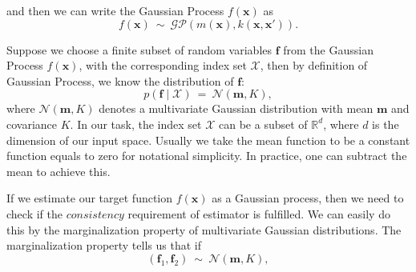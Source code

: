 \documentclass[12pt,a4paper]{article}
\theoremstyle{definition}
\newcommand{\GP}{\mathcal{GP}}
\numberwithin{equation}{section}
\let\vec\mathbf
\begin{document}
and then we can write the Gaussian Process $f(\vec x)$ as
\begin{equation} \label{}
f(\vec x) \  \sim \ \GP\left(m(\vec{x}),k(\vec{x},\vec{x'})  \right).
\end{equation}

Suppose we choose a finite subset of random variables $\vec f$ from the Gaussian Process $f(\vec x)$, with the corresponding index set $\mathcal X$, then by definition of Gaussian Process, we know the distribution of $\vec f$:
\begin{equation} \label{}
p\left(\vec f \mid \mathcal X\right)\ =\ \mathcal N \left(\vec m , K \right),
\end{equation}
where $\mathcal N \left(\vec m , K \right)$ denotes a multivariate Gaussian distribution with mean $\vec m$ and covariance $K$. 
In our task, the index set $\mathcal X$ can be a subset of $\mathbb R ^d$, where $d$ is the dimension of our input space. Usually we take the mean function to be a constant function equals to zero for notational simplicity. In practice, one can subtract the mean to achieve this. 

If we estimate our target function $f(\vec x)$ as a Gaussian process, then we need to check if the $consistency$ requirement of estimator is fulfilled. We can easily do this by the marginalization property of multivariate Gaussian distributions. The marginalization property tells us that if 
\begin{equation*} \label{}
\left(\vec f_1, \vec f_2\right)\ \sim \ \mathcal N \left(\vec m , K \right),
\end{equation*}
\end{document}
